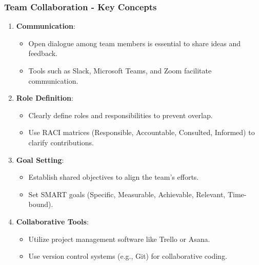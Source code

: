 \documentclass[aspectratio=169]{beamer}
\begin{document}
\begin{frame}[fragile]
    \frametitle{Team Collaboration - Key Concepts}
    \begin{enumerate}
        \item \textbf{Communication}:
        \begin{itemize}
            \item Open dialogue among team members is essential to share ideas and feedback.
            \item Tools such as Slack, Microsoft Teams, and Zoom facilitate communication.
        \end{itemize}
        
        \item \textbf{Role Definition}:
        \begin{itemize}
            \item Clearly define roles and responsibilities to prevent overlap.
            \item Use RACI matrices (Responsible, Accountable, Consulted, Informed) to clarify contributions.
        \end{itemize}
        
        \item \textbf{Goal Setting}:
        \begin{itemize}
            \item Establish shared objectives to align the team's efforts.
            \item Set SMART goals (Specific, Measurable, Achievable, Relevant, Time-bound).
        \end{itemize}
        
        \item \textbf{Collaborative Tools}:
        \begin{itemize}
            \item Utilize project management software like Trello or Asana.
            \item Use version control systems (e.g., Git) for collaborative coding.
        \end{itemize}
    \end{enumerate}
\end{frame}
\end{document}
